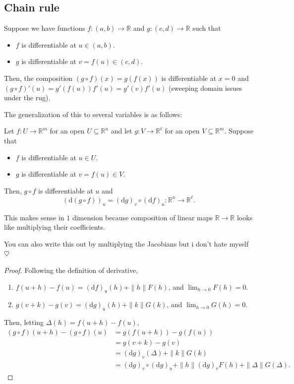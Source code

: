 \documentclass[10pt]{scrartcl}
\providecommand{\RR}{\mathbb R}
\providecommand{\ii}{\item}
\begin{document}
\subsection{Chain rule}
\begin{example}
	Suppose we have functions $f\colon (a,b)\to\RR$ and $g\colon(c, d)\to\RR$
	such that
	\begin{itemize}
		\ii $f$ is differentiable at $u\in (a,b)$.
		\ii $g$ is differentiable at $v = f(u)\in (c,d)$.
	\end{itemize}
	Then, the composition $(g\circ f)(x) = g(f(x))$ is differentiable at $x=0$
	and $(g\circ f)'(u) = g'(f(u))f'(u) = g'(v)f'(u)$
	(sweeping domain issues under the rug).
\end{example}

The generalization of this to several variables is as follows:
\begin{theorem}
	Let $f\colon U\to \RR^m$ for an open $U\subseteq\RR^n$
	and let $g\colon V\to\RR^\ell$ for an open $V\subseteq \RR^m$.
	Suppose that
	\begin{itemize}
		\ii $f$ is differentiable at $u\in U$.
		\ii $g$ is differentiable at $v = f(u)\in V$.
	\end{itemize}
	Then, $g\circ f$ is differentiable at $u$ and
	\[(\mathrm d(g\circ f))_u = (\mathrm dg)_v \circ (\mathrm df)_u
	\colon\RR^n\to\RR^\ell.\]
\end{theorem}

\begin{remark}
	This makes sense in $1$ dimension because composition of linear maps
	$\RR\to\RR$ looks like multiplying their coefficients.
\end{remark}

You can also write this out by multiplying the Jacobians but
i don't hate myself $\heartsuit$

\begin{proof}
	Following the definition of derivative,
	\begin{enumerate}[(1)]
		\ii $f(u + h) - f(u) = (\mathrm df)_u(h) + \|h\| F(h)$,
		and $\lim_{h\to 0} F(h) = 0$.
		\ii $g(v + k) - g(v) = (\mathrm dg)_u(h) + \|k\| G(k)$,
		and $\lim_{h\to 0} G(h) = 0$.
	\end{enumerate}
	Then, letting $\Delta(h) = f(u+h) - f(u)$,
	\begin{align*}
		(g\circ f)(u + h) - (g\circ f)(u)
		&= g(f(u + h)) - g(f(u))\\
		&= g(v + k) - g(v)\\
		&= (\mathrm dg)_v(\Delta) + \|k\|G(k)\\
		&= (\mathrm dg)_v\circ (\mathrm dg)_u + \|h\|(\mathrm dg)_v F(h)
		+ \|\Delta\|G(\Delta).
	\end{align*}
\end{proof}
\end{document}
